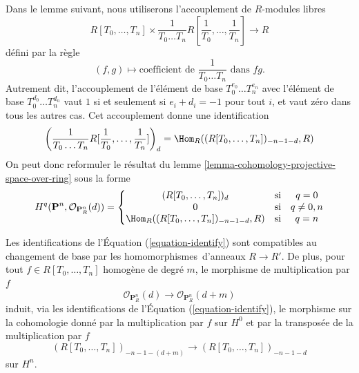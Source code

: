 \noindent
Dans le lemme suivant, nous utiliserons l'accouplement de
$R$-modules libres
$$
R[T_0, \ldots, T_n]
\times
\frac{1}{T_0 \ldots T_n} R[\frac{1}{T_0}, \ldots, \frac{1}{T_n}]
\longrightarrow
R
$$
défini par la règle
$$
(f, g)
\longmapsto
\text{coefficient de }
\frac{1}{T_0 \ldots T_n}
\text{ dans }fg.
$$
Autrement dit, l'accouplement de l'élément de base $T_0^{e_0} \ldots T_n^{e_n}$ avec
l'élément de base $T_0^{d_0} \ldots T_n^{d_n}$ vaut $1$ si et seulement
si $e_i + d_i = -1$ pour tout $i$, et vaut zéro dans tous les autres
cas. Cet accouplement donne une identification
$$
\left(\frac{1}{T_0 \ldots T_n} R[\frac{1}{T_0}, \ldots, \frac{1}{T_n}]\right)_d
=
\Hom_R((R[T_0, \ldots, T_n])_{-n - 1 - d}, R)
$$
On peut donc reformuler le résultat du
lemme \ref{lemma-cohomology-projective-space-over-ring} sous la forme
\begin{equation}
\label{equation-identify}
H^q(\mathbf{P}^n, \mathcal{O}_{\mathbf{P}^n_R}(d)) =
\left\{
\begin{matrix}
(R[T_0, \ldots, T_n])_d & \text{si} & q = 0 \\
0 & \text{si} & q \not = 0, n \\
\Hom_R((R[T_0, \ldots, T_n])_{-n - 1 - d}, R)
& \text{si} & q = n
\end{matrix}
\right.
\end{equation}

\begin{lemma}
\label{lemma-identify-functorially}
Les identifications de l'Équation (\ref{equation-identify}) sont compatibles
au changement de base par les homomorphismes\ d'anneaux $R \to R'$.
De plus, pour tout $f \in R[T_0, \ldots, T_n]$ homogène
de degré $m$, le morphisme de multiplication par $f$
$$
\mathcal{O}_{\mathbf{P}^n_R}(d)
\longrightarrow
\mathcal{O}_{\mathbf{P}^n_R}(d + m)
$$
induit, via les identifications de
l'Équation (\ref{equation-identify}), le morphisme sur la cohomologie donné par la multiplication par
$f$ sur $H^0$ et par la transposée de la multiplication par $f$
$$
(R[T_0, \ldots, T_n])_{-n - 1 - (d + m)}
\longrightarrow
(R[T_0, \ldots, T_n])_{-n - 1 - d}
$$
sur $H^n$.
\end{lemma}

